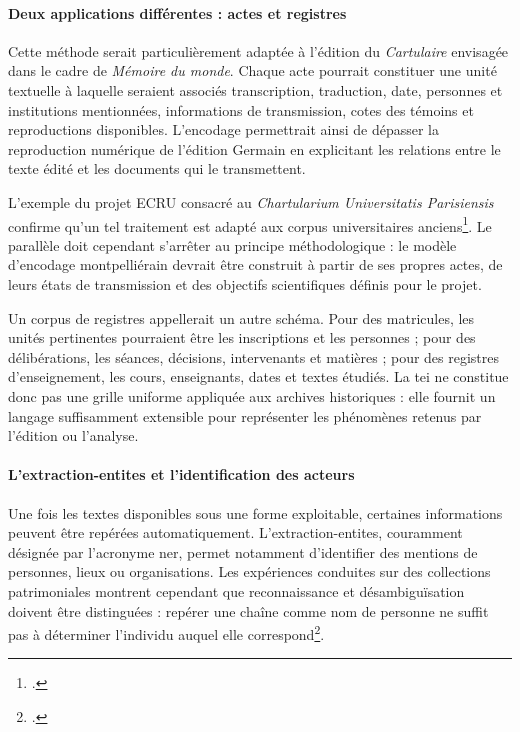 \paragraph{Deux applications différentes : actes et registres}

Cette méthode serait particulièrement adaptée à l'édition du \emph{Cartulaire} envisagée dans le cadre de \emph{Mémoire du monde}. Chaque acte pourrait constituer une unité textuelle à laquelle seraient associés transcription, traduction, date, personnes et institutions mentionnées, informations de transmission, cotes des témoins et reproductions disponibles. L'encodage permettrait ainsi de dépasser la reproduction numérique de l'édition Germain en explicitant les relations entre le texte édité et les documents qui le transmettent.

L'exemple du projet ECRU consacré au \emph{Chartularium Universitatis Parisiensis} confirme qu'un tel traitement est adapté aux corpus universitaires anciens\footcite{BiblissimaECRU}. Le parallèle doit cependant s'arrêter au principe méthodologique : le modèle d'encodage montpelliérain devrait être construit à partir de ses propres actes, de leurs états de transmission et des objectifs scientifiques définis pour le projet.

Un corpus de registres appellerait un autre schéma. Pour des matricules, les unités pertinentes pourraient être les inscriptions et les personnes ; pour des délibérations, les séances, décisions, intervenants et matières ; pour des registres d'enseignement, les cours, enseignants, dates et textes étudiés. La \gls{tei} ne constitue donc pas une grille uniforme appliquée aux archives historiques : elle fournit un langage suffisamment extensible pour représenter les phénomènes retenus par l'édition ou l'analyse.


\paragraph{L'\gls{extraction-entites} et l'identification des acteurs}

Une fois les textes disponibles sous une forme exploitable, certaines informations peuvent être repérées automatiquement. L'\gls{extraction-entites}, couramment désignée par l'acronyme \gls{ner}, permet notamment d'identifier des mentions de personnes, lieux ou organisations. Les expériences conduites sur des collections patrimoniales montrent cependant que reconnaissance et désambiguïsation doivent être distinguées : repérer une chaîne comme nom de personne ne suffit pas à déterminer l'individu auquel elle correspond\footcite{VanHoolandEtAl2015NER}.

